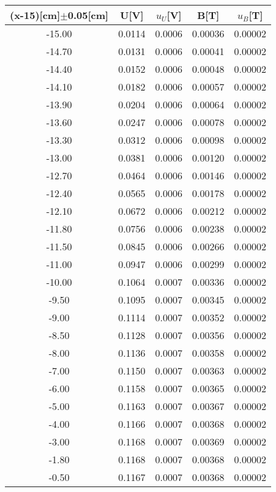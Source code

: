 \documentclass[12pt,a4paper]{article}
\begin{document}
\begin{table}[H]
    \centering
    \begin{tabular}{|c|c|c|c|c|}
    \hline
    (x-15)[cm]$\pm$0.05[cm] & U[V] & $u_U$[V] & B[T] & $u_B$[T]  \\ \hline
    -15.00 & 0.0114 & 0.0006 & 0.00036 & 0.00002 \\ \hline
    -14.70 & 0.0131 & 0.0006 & 0.00041 & 0.00002 \\ \hline
    -14.40 & 0.0152 & 0.0006 & 0.00048 & 0.00002 \\ \hline
    -14.10 & 0.0182 & 0.0006 & 0.00057 & 0.00002 \\ \hline
    -13.90 & 0.0204 & 0.0006 & 0.00064 & 0.00002 \\ \hline
    -13.60 & 0.0247 & 0.0006 & 0.00078 & 0.00002 \\ \hline
    -13.30 & 0.0312 & 0.0006 & 0.00098 & 0.00002 \\ \hline
    -13.00 & 0.0381 & 0.0006 & 0.00120 & 0.00002 \\ \hline
    -12.70 & 0.0464 & 0.0006 & 0.00146 & 0.00002 \\ \hline
    -12.40 & 0.0565 & 0.0006 & 0.00178 & 0.00002 \\ \hline
    -12.10 & 0.0672 & 0.0006 & 0.00212 & 0.00002 \\ \hline
    -11.80 & 0.0756 & 0.0006 & 0.00238 & 0.00002 \\ \hline
    -11.50 & 0.0845 & 0.0006 & 0.00266 & 0.00002 \\ \hline
    -11.00 & 0.0947 & 0.0006 & 0.00299 & 0.00002 \\ \hline
    -10.00 & 0.1064 & 0.0007 & 0.00336 & 0.00002 \\ \hline
    -9.50  & 0.1095 & 0.0007 & 0.00345 & 0.00002 \\ \hline
    -9.00  & 0.1114 & 0.0007 & 0.00352 & 0.00002 \\ \hline
    -8.50  & 0.1128 & 0.0007 & 0.00356 & 0.00002 \\ \hline
    -8.00  & 0.1136 & 0.0007 & 0.00358 & 0.00002 \\ \hline
    -7.00  & 0.1150 & 0.0007 & 0.00363 & 0.00002 \\ \hline
    -6.00  & 0.1158 & 0.0007 & 0.00365 & 0.00002 \\ \hline
    -5.00  & 0.1163 & 0.0007 & 0.00367 & 0.00002 \\ \hline
    -4.00  & 0.1166 & 0.0007 & 0.00368 & 0.00002 \\ \hline
    -3.00  & 0.1168 & 0.0007 & 0.00369 & 0.00002 \\ \hline
    ~~~~~~~-1.80~~~~~~~  & 0.1168 & 0.0007 & 0.00368 & 0.00002 \\ \hline
    -0.50  & 0.1167 & 0.0007 & 0.00368 & 0.00002 \\ \hline
    \end{tabular}
\end{table}
\end{document}
